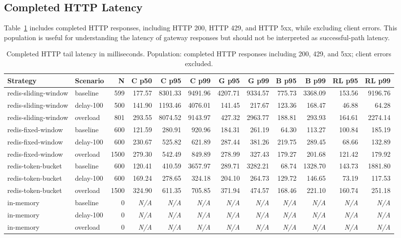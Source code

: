 \documentclass[conference]{IEEEtran}
\newcommand{\na}{\textit{N/A}}
\begin{document}
\subsection{Completed HTTP Latency}
Table~\ref{tab:completed} includes completed HTTP responses, including HTTP 200, HTTP 429, and HTTP 5xx, while excluding client errors. This population is useful for understanding the latency of gateway responses but should not be interpreted as successful-path latency.

\begin{table}[t]
\centering
\tiny
\caption{Completed HTTP tail latency in milliseconds. Population: completed HTTP responses including 200, 429, and 5xx; client errors excluded.}
\label{tab:completed}
\begin{tabular}{llrrrrrrrrrr}
\hline
Strategy & Scenario & N & C p50 & C p95 & C p99 & G p95 & G p99 & B p95 & B p99 & RL p95 & RL p99 \\
\hline
redis-sliding-window & baseline & 599 & 177.57 & 8301.33 & 9491.96 & 4207.71 & 9334.57 & 775.73 & 3368.09 & 153.56 & 9196.76 \\
redis-sliding-window & delay-100 & 500 & 141.90 & 1193.46 & 4076.01 & 141.45 & 217.67 & 123.36 & 168.47 & 46.88 & 64.28 \\
redis-sliding-window & overload & 801 & 293.55 & 8074.52 & 9143.97 & 427.32 & 2963.77 & 188.81 & 293.93 & 164.61 & 2274.14 \\
redis-fixed-window & baseline & 600 & 121.59 & 280.91 & 920.96 & 184.31 & 261.19 & 64.30 & 113.27 & 100.84 & 185.19 \\
redis-fixed-window & delay-100 & 600 & 230.67 & 525.82 & 621.89 & 287.44 & 381.26 & 219.75 & 289.45 & 68.66 & 132.89 \\
redis-fixed-window & overload & 1500 & 279.30 & 542.49 & 849.89 & 278.99 & 327.43 & 179.27 & 201.68 & 121.42 & 179.92 \\
redis-token-bucket & baseline & 600 & 120.41 & 410.59 & 3657.97 & 289.71 & 3282.21 & 68.74 & 1328.70 & 143.73 & 1881.80 \\
redis-token-bucket & delay-100 & 600 & 169.24 & 278.65 & 324.18 & 204.10 & 264.73 & 129.72 & 146.65 & 73.19 & 117.53 \\
redis-token-bucket & overload & 1500 & 324.90 & 611.35 & 705.85 & 371.94 & 474.57 & 168.46 & 221.10 & 160.74 & 251.18 \\
in-memory & baseline & 0 & \na & \na & \na & \na & \na & \na & \na & \na & \na \\
in-memory & delay-100 & 0 & \na & \na & \na & \na & \na & \na & \na & \na & \na \\
in-memory & overload & 0 & \na & \na & \na & \na & \na & \na & \na & \na & \na \\
\hline
\end{tabular}
\end{table}
\end{document}
